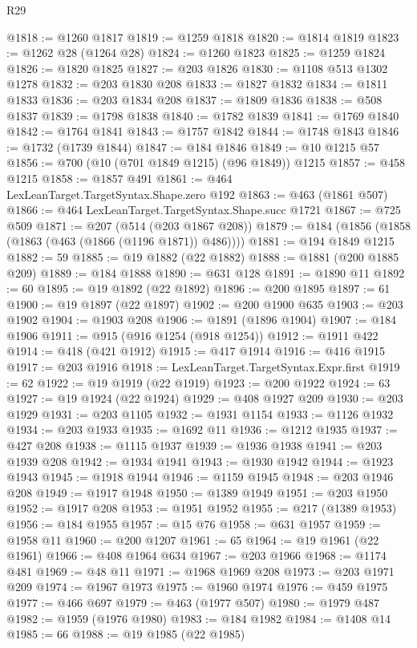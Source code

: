 \begin{lexlean}{R29}
\begin{coremodule}
@1818 := @1260 @1817
@1819 := @1259 @1818
@1820 := @1814 @1819
@1823 := @1262 @28 (@1264 @28)
@1824 := @1260 @1823
@1825 := @1259 @1824
@1826 := @1820 @1825
@1827 := @203 @1826
@1830 := @1108 @513 @1302 @1278
@1832 := @203 @1830 @208
@1833 := @1827 @1832
@1834 := @1811 @1833
@1836 := @203 @1834 @208
@1837 := @1809 @1836
@1838 := @508 @1837
@1839 := @1798 @1838
@1840 := @1782 @1839
@1841 := @1769 @1840
@1842 := @1764 @1841
@1843 := @1757 @1842
@1844 := @1748 @1843
@1846 := @1732 (@1739 @1844)
@1847 := @184 @1846
@1849 := @10 @1215 @57
@1856 := @700 (@10 (@701 @1849 @1215) (@96 @1849)) @1215
@1857 := @458 @1215
@1858 := @1857 @491
@1861 := @464 LexLeanTarget.TargetSyntax.Shape.zero @192
@1863 := @463 (@1861 @507)
@1866 := @464 LexLeanTarget.TargetSyntax.Shape.succ @1721
@1867 := @725 @509
@1871 := @207 (@514 (@203 @1867 @208))
@1879 := @184 (@1856 (@1858 (@1863 (@463 (@1866 (@1196 @1871)) @486))))
@1881 := @194 @1849 @1215
@1882 := 59
@1885 := @19 @1882 (@22 @1882)
@1888 := @1881 (@200 @1885 @209)
@1889 := @184 @1888
@1890 := @631 @128
@1891 := @1890 @11
@1892 := 60
@1895 := @19 @1892 (@22 @1892)
@1896 := @200 @1895
@1897 := 61
@1900 := @19 @1897 (@22 @1897)
@1902 := @200 @1900 @635
@1903 := @203 @1902
@1904 := @1903 @208
@1906 := @1891 (@1896 @1904)
@1907 := @184 @1906
@1911 := @915 (@916 @1254 (@918 @1254))
@1912 := @1911 @422
@1914 := @418 (@421 @1912)
@1915 := @417 @1914
@1916 := @416 @1915
@1917 := @203 @1916
@1918 := LexLeanTarget.TargetSyntax.Expr.first
@1919 := 62
@1922 := @19 @1919 (@22 @1919)
@1923 := @200 @1922
@1924 := 63
@1927 := @19 @1924 (@22 @1924)
@1929 := @408 @1927 @209
@1930 := @203 @1929
@1931 := @203 @1105
@1932 := @1931 @1154
@1933 := @1126 @1932
@1934 := @203 @1933
@1935 := @1692 @11
@1936 := @1212 @1935
@1937 := @427 @208
@1938 := @1115 @1937
@1939 := @1936 @1938
@1941 := @203 @1939 @208
@1942 := @1934 @1941
@1943 := @1930 @1942
@1944 := @1923 @1943
@1945 := @1918 @1944
@1946 := @1159 @1945
@1948 := @203 @1946 @208
@1949 := @1917 @1948
@1950 := @1389 @1949
@1951 := @203 @1950
@1952 := @1917 @208
@1953 := @1951 @1952
@1955 := @217 (@1389 @1953)
@1956 := @184 @1955
@1957 := @15 @76
@1958 := @631 @1957
@1959 := @1958 @11
@1960 := @200 @1207
@1961 := 65
@1964 := @19 @1961 (@22 @1961)
@1966 := @408 @1964 @634
@1967 := @203 @1966
@1968 := @1174 @481
@1969 := @48 @11
@1971 := @1968 @1969 @208
@1973 := @203 @1971 @209
@1974 := @1967 @1973
@1975 := @1960 @1974
@1976 := @459 @1975
@1977 := @466 @697
@1979 := @463 (@1977 @507)
@1980 := @1979 @487
@1982 := @1959 (@1976 @1980)
@1983 := @184 @1982
@1984 := @1408 @14
@1985 := 66
@1988 := @19 @1985 (@22 @1985)

\end{coremodule}
\end{lexlean}
